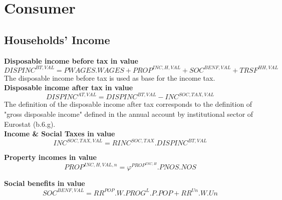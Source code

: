 \documentclass[12pt]{article}
\numberwithin{equation}{section}
\begin{document}
\section{Consumer}





\subsection{Households' Income}


\noindent\textbf{Disposable income before tax in value} \\
\begin{dmath}
DISPINC^{BT,VAL} = PWAGES . WAGES + PROP^{INC,H,VAL} + SOC^{BENF,VAL} + TRSF^{HH,VAL}
\end{dmath}
The disposable income before tax is used as base for the income tax. \\

\noindent\textbf{Disposable income after tax in value} \\
\begin{dmath}
DISPINC^{AT,VAL} = DISPINC^{BT,VAL} - INC^{SOC,TAX,VAL}
\end{dmath}
The definition of the disposable income after tax corresponds to the definition of "gross disposable income" defined in the annual account by institutional sector of Eurostat (b.6.g). \\

\noindent\textbf{Income \& Social Taxes in value} \\
\begin{dmath}
INC^{SOC,TAX,VAL} = RINC^{SOC,TAX} . DISPINC^{BT,VAL}
\end{dmath}

\noindent\textbf{Property incomes in value} \\
\begin{dmath}
PROP^{INC,H,VAL,n} = \varphi^{PROP^{INC,H}} . PNOS . NOS
\end{dmath}

\noindent\textbf{Social benefits in value} \\

\begin{dmath}
SOC^{BENF,VAL} = RR^{POP} . W . PROG^{L} . P . POP + RR^{Un} . W . Un
\end{dmath}
\end{document}
